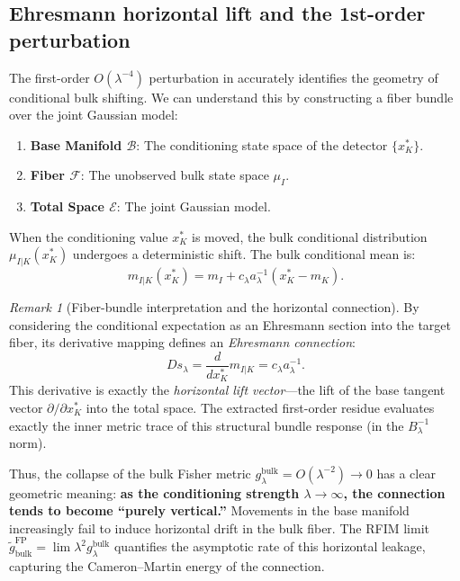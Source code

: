 \documentclass[11pt]{amsart}
\theoremstyle{plain}
\theoremstyle{definition}
\theoremstyle{remark}
\newtheorem{remark}[theorem]{Remark}
\begin{document}
\subsection{Ehresmann horizontal lift and the 1st-order perturbation}

The first-order $O(\lambda^{-4})$ perturbation in  accurately identifies the geometry of conditional bulk shifting. We can understand this by constructing a fiber bundle over the joint Gaussian model:
\begin{enumerate}
\item \textbf{Base Manifold $\mathcal{B}$}: The conditioning state space of the detector $\{x_K^*\}$.
\item \textbf{Fiber $\mathcal{F}$}: The unobserved bulk state space $\mu_I$.
\item \textbf{Total Space $\mathcal{E}$}: The joint Gaussian model.
\end{enumerate}

When the conditioning value $x_K^*$ is moved, the bulk conditional distribution $\mu_{I|K}(x_K^*)$ undergoes a deterministic shift. The bulk conditional mean is:
\begin{equation}
  m_{I|K}(x_K^*) = m_I + c_\lambda a_\lambda^{-1}(x_K^* - m_K).
\end{equation}

\begin{remark}[Fiber-bundle interpretation and the horizontal connection]
\label{rem:fiber_bundle_connection}
By considering the conditional expectation as an Ehresmann section into the target fiber, its derivative mapping defines an \emph{Ehresmann connection}:
\begin{equation}
  Ds_\lambda = \frac{d}{dx_K^*} m_{I|K} = c_\lambda a_\lambda^{-1}.
\end{equation}
This derivative is exactly the \emph{horizontal lift vector}---the lift of the base tangent vector $\partial/\partial x_K^*$ into the total space. The extracted first-order residue evaluates exactly the inner metric trace of this structural bundle response (in the $B_\lambda^{-1}$ norm). 

Thus, the collapse of the bulk Fisher metric $g_\lambda^{\mathrm{bulk}} = O(\lambda^{-2}) \to 0$ has a clear geometric meaning: \textbf{as the conditioning strength $\lambda \to \infty$, the connection tends to become ``purely vertical.''} Movements in the base manifold increasingly fail to induce horizontal drift in the bulk fiber. The RFIM limit $\widetilde{g}_{\mathrm{bulk}}^{\mathrm{FP}} = \lim \lambda^2 g_\lambda^{\mathrm{bulk}}$ quantifies the asymptotic rate of this horizontal leakage, capturing the Cameron--Martin energy of the connection.
\end{remark}
\end{document}
